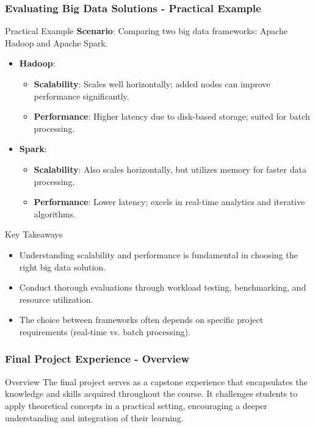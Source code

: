 \documentclass[aspectratio=169]{beamer}
\begin{document}
\begin{frame}[fragile]
  \frametitle{Evaluating Big Data Solutions - Practical Example}
  \begin{block}{Practical Example}
    \textbf{Scenario}: Comparing two big data frameworks: Apache Hadoop and Apache Spark.
    
    \begin{itemize}
      \item \textbf{Hadoop}:
        \begin{itemize}
          \item \textbf{Scalability}: Scales well horizontally; added nodes can improve performance significantly.
          \item \textbf{Performance}: Higher latency due to disk-based storage; suited for batch processing.
        \end{itemize}
      \item \textbf{Spark}:
        \begin{itemize}
          \item \textbf{Scalability}: Also scales horizontally, but utilizes memory for faster data processing.
          \item \textbf{Performance}: Lower latency; excels in real-time analytics and iterative algorithms.
        \end{itemize}
    \end{itemize}
  \end{block}

  \begin{block}{Key Takeaways}
    \begin{itemize}
      \item Understanding scalability and performance is fundamental in choosing the right big data solution.
      \item Conduct thorough evaluations through workload testing, benchmarking, and resource utilization.
      \item The choice between frameworks often depends on specific project requirements (real-time vs. batch processing).
    \end{itemize}
  \end{block}
\end{frame}

\begin{frame}[fragile]
    \frametitle{Final Project Experience - Overview}
    \begin{block}{Overview}
        The final project serves as a capstone experience that encapsulates the knowledge and skills acquired throughout the course. 
        It challenges students to apply theoretical concepts in a practical setting, encouraging a deeper understanding and integration of their learning.
    \end{block}
\end{frame}
\end{document}
